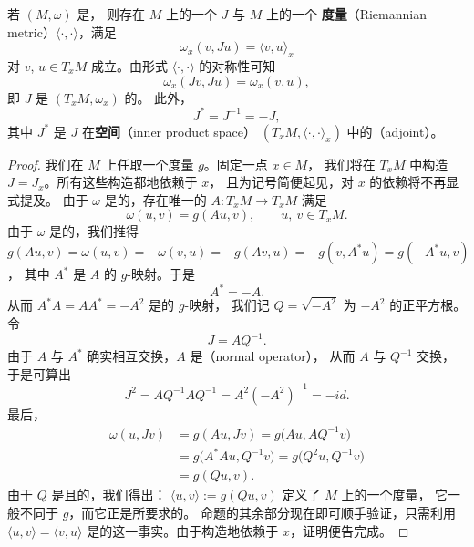 \begin{proposition}\label{prop:almost-complex-structure}
若 $(M,\omega)$ 是\trSymplecticManifold，%
则存在 $M$ 上的一个\trAlmostComplexStructure{} $J$ 与 $M$ 上的一个%
\textbf{\trRiemann{}度量}（Riemannian metric）$\langle\cdot,\cdot\rangle$，满足
\begin{equation}\label{eq:compatible-metric}
\omega_x(v,Ju)=\langle v,u\rangle_x
\end{equation}
对 $v$, $u\in T_xM$ 成立。由\trBilinear{}形式 $\langle\cdot,\cdot\rangle$ 的对称性可知
\begin{equation}\label{eq:j-symplectic-map}
\omega_x(Jv,Ju)=\omega_x(v,u),
\end{equation}
即 $J$ 是\trSymplecticVectorSpace{} $(T_xM,\omega_x)$ 的\trSymplecticMapping。%
此外，
\begin{equation}\label{eq:j-adjoint}
J^{*}=J^{-1}=-J,
\end{equation}
其中 $J^{*}$ 是 $J$ 在\textbf{\trInnerProduct{}空间}（inner product space）%
$(T_xM,\langle\cdot,\cdot\rangle_x)$ 中的\textbf{\trAdjoint}（adjoint）。
\end{proposition}
\begin{proof}
我们在 $M$ 上任取一个\trRiemann{}度量 $g$。固定一点 $x\in M$，%
我们将在 $T_xM$ 中构造 $J=J_x$。所有这些构造都\trSmooth{}地依赖于 $x$，%
且为记号简便起见，对 $x$ 的依赖将不再显式提及。%
由于 $\omega$ 是\trNondegenerate{}的，存在唯一的\trLinear\trIsomorphism{}%
$A:T_xM\to T_xM$ 满足
\[
\omega(u,v)=g(Au,v),\qquad u,\ v\in T_xM.
\]
由于 $\omega$ 是\trAntisymmetric{}的，我们推得
$g(Au,v)=\omega(u,v)=-\omega(v,u)=-g(Av,u)=-g(v,A^{*}u)=g(-A^{*}u,v)$，%
其中 $A^{*}$ 是 $A$ 的 $g$-\trAdjoint{}映射。于是
\[
A^{*}=-A.
\]
从而 $A^{*}A=AA^{*}=-A^{2}$ 是\trPositiveDefinite{}的 $g$-\trSelfAdjoint{}映射，%
我们记 $Q=\sqrt{-A^{2}}$ 为 $-A^{2}$ 的正平方根。令
\[
J=AQ^{-1}.
\]
由于 $A$ 与 $A^{*}$ 确实相互交换，$A$ 是\textbf{\trNormalOperator}（normal operator），%
从而 $A$ 与 $Q^{-1}$ 交换，于是可算出
\[
J^{2}=AQ^{-1}AQ^{-1}=A^{2}(-A^{2})^{-1}=-id.
\]
最后，
\begin{align*}
\omega(u,Jv) &= g(Au,Jv) = g\bigl(Au,AQ^{-1}v\bigr)\\
&= g\bigl(A^{*}Au,Q^{-1}v\bigr) = g\bigl(Q^{2}u,Q^{-1}v\bigr)\\
&= g(Qu,v).
\end{align*}
由于 $Q$ 是\trSymmetric{}且\trPositiveDefinite{}的，我们得出：%
$\langle u,v\rangle:=g(Qu,v)$ 定义了 $M$ 上的一个\trRiemann{}度量，%
它一般不同于 $g$，而它正是所要求的\trMetric。%
命题的其余部分现在即可顺手验证，只需利用\trMetric{} $\langle u,v\rangle=\langle v,u\rangle$%
是\trSymmetric{}的这一事实。由于构造\trSmooth{}地依赖于 $x$，证明便告完成。
\end{proof}

